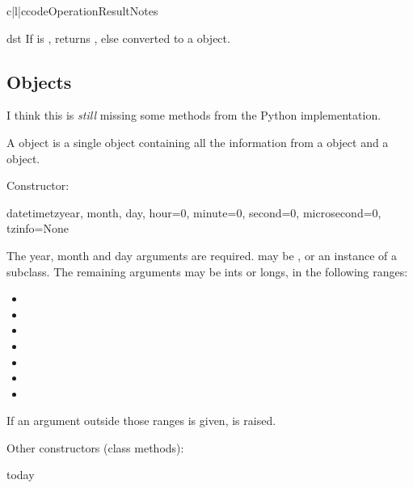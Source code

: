 \begin{tableiii}{c|l|c}{code}{Operation}{Result}{Notes}
\begin{methoddesc}{dst}{}
    If  is , returns , else
     converted to a  object.
\end{methoddesc}



\subsection{  Objects \label{datetime-datetimetz}}

\begin{notice}[warning]
  I think this is \emph{still} missing some methods from the
  Python implementation.
\end{notice}

A  object is a single object containing all the information
from a  object and a  object.

Constructor:

\begin{funcdesc}{datetimetz}{year, month, day,
               hour=0, minute=0, second=0, microsecond=0, tzinfo=None}

    The year, month and day arguments are required.   may
    be , or an instance of a  subclass.  The
    remaining arguments may be ints or longs, in the following ranges:

\begin{itemize}
  \item {}
  \item {}
  \item {}
  \item {}
  \item {}
  \item {}
  \item {}
\end{itemize}

    If an argument outside those ranges is given,
     is raised.
\end{funcdesc}

Other constructors (class methods):

\begin{funcdesc}{today}{}


\end{funcdesc}
\end{tableiii}
